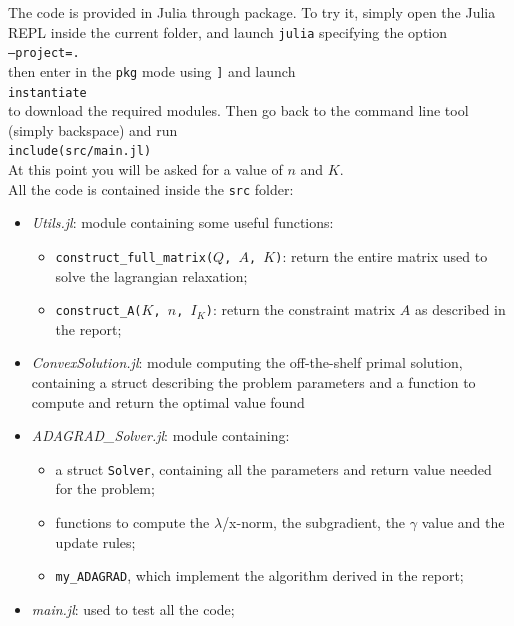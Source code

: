 \documentclass[notitlepage]{article}
\begin{document}
The code is provided in Julia through package. To try it, simply open the Julia REPL inside the current folder, and launch \texttt{julia} specifying the option\\[0.2ex]
\hspace*{0.5ex}\hspace{0.5ex}\hspace{0.5ex}\texttt{--project=.}\\[0.2ex]
then enter in the \texttt{pkg} mode using \texttt{]} and launch\\[0.2ex]
\hspace*{0.5ex}\hspace{0.5ex}\hspace{0.5ex}\texttt{instantiate}\\[0.2ex]
to download the required modules. Then go back to the command line tool (simply backspace) and run\\[0.2ex]
\hspace*{0.5ex}\hspace{0.5ex}\hspace{0.5ex}\texttt{include(src/main.jl)}\\[0.2ex]
At this point you will be asked for a value of $n$ and $K$.\\
All the code is contained inside the \texttt{src} folder:
\begin{itemize}
  \item \textit{Utils.jl}: module containing some useful functions:
  \begin{itemize}
    \item \texttt{construct\_full\_matrix($Q$, $A$, $K$)}: return the entire matrix used to solve the lagrangian relaxation;
    \item \texttt{construct\_A($K$, $n$, $I_K$)}: return the constraint matrix $A$ as described in the report;
  \end{itemize}
  \item \textit{ConvexSolution.jl}: module computing the off-the-shelf primal solution, containing a struct describing the problem parameters and a function to compute and return the optimal value found
  \item \textit{ADAGRAD\_Solver.jl}: module containing:
  \begin{itemize}
    \item a struct \texttt{Solver}, containing all the parameters and return value needed for the problem;
    \item functions to compute the $\lambda$/x-norm, the subgradient, the $\gamma$ value and the update rules;
    \item \texttt{my\_ADAGRAD}, which implement the algorithm derived in the report;
  \end{itemize}
  \item \textit{main.jl}: used to test all the code;
\end{itemize}
\end{document}

